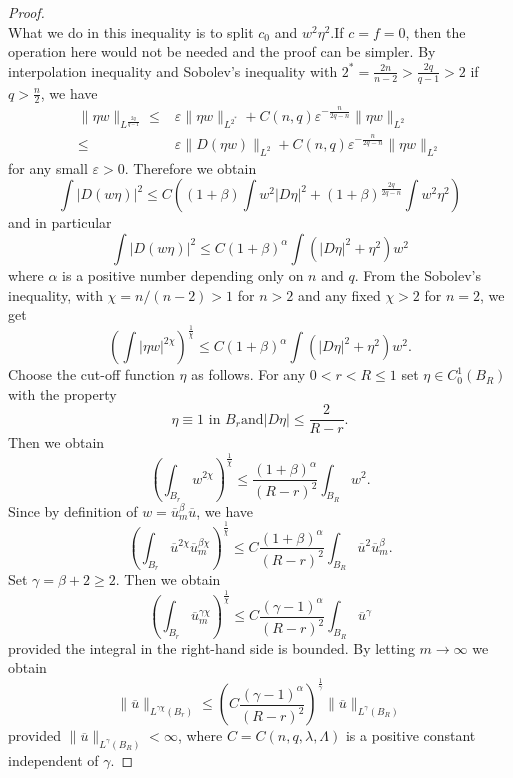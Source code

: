 \begin{proof}
\[ \] 
 What we do in this inequality is to split $c_0$ and $w^2\eta^2$.If $c=f=0$, then the operation here would not be needed and the proof can be simpler.
 By interpolation inequality and Sobolev's inequality with $2^{\ast}=\frac{2n}{n-2}>\frac{2q}{q-1}>2$ if $q>\frac{n}{2}$, we have
 \begin{align*}
   \|\eta w\|_{L^{\frac{2q}{q-1}}}\le & \varepsilon  \|\eta w\|_{L^{2^{\ast}}}+C(n,q)\varepsilon ^{-\frac{n}{2q-n}}\|\eta w\|_{L^2}\\
   \le &\varepsilon  \|D(\eta w)\|_{L^2}+C(n,q)\varepsilon ^{-\frac{n}{2q-n}}\|\eta w\|_{L^2}
 \end{align*}
 for any small $\varepsilon >0$.
 Therefore we obtain
 \[
   \int \left| D(w\eta) \right| ^2\le C\left( (1+\beta)\int w^2\left| D\eta \right| ^2+(1+\beta)^{\frac{2q}{2q-n}}\int w^2\eta^2 \right) 
 \] 
 and in particular
 \[
   \int \left| D(w\eta) \right| ^2\le C(1+\beta)^{\alpha}\int \left( \left| D\eta \right| ^2+\eta^2 \right) w^2
 \] 
 where $\alpha$ is a positive number depending only on $n$ and $q$. 
 From the Sobolev's inequality, with $\chi=n\slash(n-2)>1$ for  $n>2$ and any fixed  $\chi >2$ for $n=2$, we get
 \[
   \left( \int\left| \eta w \right| ^{2\chi} \right) ^{\frac{1}{\chi}}\le C(1+\beta)^{\alpha}\int \left( \left| D \eta \right| ^2+\eta^2 \right) w^2.
 \] 
 Choose the cut-off function $\eta$ as follows. For any $0<r<R\le 1$ set $\eta \in C_0^{1}(B_R)$ with the property
 \[
 \eta\equiv 1 \text{ in }B_r \text{and} \left| D\eta \right| \le \frac{2}{R-r}.
 \] 
 Then we obtain 
 \[
   \left( \int_{B_r}w^{2\chi} \right) ^{\frac{1}{\chi}}\le \frac{(1+\beta)^{\alpha}}{(R-r)^2}\int_{B_R}w^2.
 \] 
 Since by definition of $w=\overline{u}_m^{\beta}\overline{u} $, we have
 \[
   \left( \int_{B_r}\overline{u}^{2\chi}\overline{u}_m^{\beta\chi} \right) ^{\frac{1}{\chi}}\le C \frac{(1+\beta)^{\alpha}}{(R-r)^2}\int_{B_R}\overline{u}^2\overline{u}_m^{\beta}.
 \] 
 Set $\gamma=\beta+2\ge 2$. Then we obtain
 \[
   \left( \int_{B_r}\overline{u}_m^{\gamma\chi} \right) ^{\frac{1}{\chi}}\le C \frac{(\gamma-1)^{\alpha}}{(R-r)^2}\int_{B_R}\overline{u}^{\gamma}
 \] 
 provided the integral in the right-hand side is bounded. By letting $m\to \infty$ we obtain
 \[
   \|\overline{u}\|_{L^{\gamma\chi}(B_r)}\le \left( C \frac{(\gamma-1)^{\alpha}}{(R-r)^{2}} \right) ^{\frac{1}{\gamma}}\|\overline{u}\|_{L^{\gamma}(B_R)}
 \] provided $\|\overline{u}\|_{L^{\gamma}(B_R)}<\infty$, where $C=C(n,q,\lambda,\Lambda)$ is a positive constant independent of $\gamma$. 


\end{proof}

